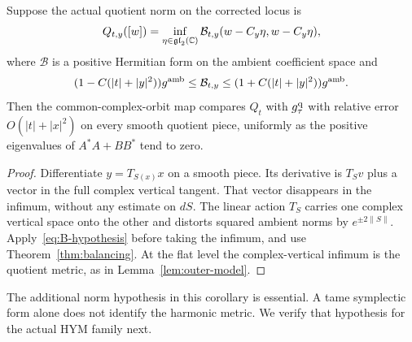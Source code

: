 \begin{corollary}\label{cor:quotient-transfer}
Suppose the actual quotient norm on the corrected locus is
\[
Q_{t,y}([w])=\inf_{\eta\in\mathfrak{gl}_2(\mathbb C)}
\mathcal B_{t,y}(w-C_y\eta,w-C_y\eta),
\]
where $\mathcal B$ is a positive Hermitian form on the ambient
coefficient space and
\begin{equation}\label{eq:B-hypothesis}
(1-C(|t|+|y|^2))g^{\rm amb}
\le\mathcal B_{t,y}\le
(1+C(|t|+|y|^2))g^{\rm amb}.
\end{equation}
Then the common-complex-orbit map compares $Q_t$ with
$g_\tau^{\rm q}$ with relative error $O(|t|+|x|^2)$ on every
smooth quotient piece, uniformly as the positive eigenvalues of
$A^*A+BB^*$ tend to zero.
\end{corollary}

\begin{proof}
Differentiate $y=T_{S(x)}x$ on a smooth piece. Its derivative is
$T_Sv$ plus a vector in the full complex vertical tangent. That
vector disappears in the infimum, without any estimate on $dS$.
The linear action $T_S$ carries one complex vertical space onto
the other and distorts squared ambient norms by $e^{\pm2\|S\|}$.
Apply~\eqref{eq:B-hypothesis} before taking the infimum, and use
Theorem~\ref{thm:balancing}. At the flat level the complex-vertical
infimum is the quotient metric, as in Lemma~\ref{lem:outer-model}.
\end{proof}

The additional norm hypothesis in this corollary is essential.
A tame symplectic form alone does not identify the harmonic metric.
We verify that hypothesis for the actual HYM family next.
